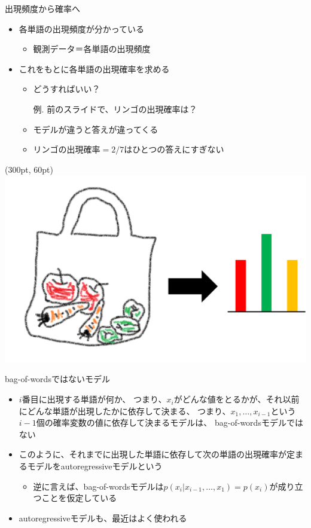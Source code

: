 \documentclass[aspectratio=169,unicode,dvipdfmx,14pt]{beamer}
\begin{document}
\begin{frame}{出現頻度から確率へ}
\begin{itemize}
\item 各単語の出現頻度が分かっている
\begin{itemize}
\item 観測データ＝各単語の出現頻度
\end{itemize}
\item これをもとに各単語の出現確率を求める
\begin{itemize}
\item どうすればいい？
\item[例.] 前のスライドで、リンゴの出現確率は？
\item モデルが違うと答えが違ってくる
\item $\mbox{リンゴの出現確率}=2/7$はひとつの答えにすぎない
\end{itemize}
\end{itemize}
\begin{textblock*}{0.4\linewidth}(300pt, 60pt)
    \centering
    \includegraphics[width=.8\linewidth]{bagofwords.png}
\end{textblock*}
\end{frame}

\begin{frame}{bag-of-wordsではないモデル}
\begin{itemize}
\item $i$番目に出現する単語が何か、
つまり、$x_i$がどんな値をとるかが、それ以前にどんな単語が出現したかに依存して決まる、
つまり、$x_1,\ldots,x_{i-1}$という$i-1$個の確率変数の値に依存して決まるモデルは、
bag-of-wordsモデルではない
\item このように、それまでに出現した単語に依存して次の単語の出現確率が定まるモデルをautoregressiveモデルという
\begin{itemize}
\item 逆に言えば、bag-of-wordsモデルは$p(x_i|x_{i-1},\ldots,x_1)=p(x_i)$が成り立つことを仮定している
\end{itemize}
\item autoregressiveモデルも、最近はよく使われる
\end{itemize}
\end{frame}
\end{document}
